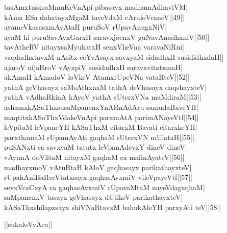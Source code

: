 \documentclass{article}
\begin{document}
tasAmxtusxsaMmuKeVnApi pibasavx madhumAdhaviVM|\\
kAma ESa dahatayxMgaM taveVdaM cAruloVcaneV||49||\\
ayameVkasasxmAyAtaH puruSoV rUpavAnugxNiV|\\
ayaM hi puruSavAyxGarxH saravxjocnxV guNavAnadhxniV||50||\\
tavAtheRV nitayxsaMyukatxH senxVheVna varavaNiRni|\\
vaqdadhxtavxM nAsitx ceYvAsayx savxyaM sidadhxH susididhxdaH||\\
ajaroV nijaRroV vAyxpiV susidadhxH saravxvitatxmaH|\\
akAmaH kAmadoV loVkeV AtamxrUpeVNa vataRteV||52||\\
yathA geVhasayx saMsAthxnaM tathA deVhasayx daqshayxteV|\\
yathA vAdhaRkinA kAyoV yathA sUterxVNa maMdiraM||53||\\
ashamxkASaThxsusaMpanenxYnARnAdAru samudaBxveYH|\\
maqtitxkASoThxVdakeVnApi parxmAtA parimANayeVtf||54||\\
leVpitaM leVpaneYH kASaThxM citarxM Bavati citarxkeYH|\\
parxthamaM rUpamAyAti gaqhaM sUterxVN mUlataH||55||\\
puSANxti ca savxyaM tatutx leVpanAdevxY dineV dineV|\\
vAyunA doVlitaM nitayxM gaqhaM ca malinAyateV||56||\\
madhayxmoV vAtuRtaH kAloV gaqhasayx parikathayxteV|\\
rUpahAniBaRveVtatxsayx gaqhasAvxmiV vileVpayeVtf||57||\\
sevxVcaCxyA ca gaqhasAvxmiV rUpavaMtaM nayeVdagxqhaM|\\
saMpanenxV tasayx geVhasayx dUtikeV parikathayxteV|\\
kASaThxshilapxsayx shiVNaRtavxM bahukAleYH parxyAti teV||58||\\

\begin{center}
||sukaloVvAca||
\end{center}
\end{document}
